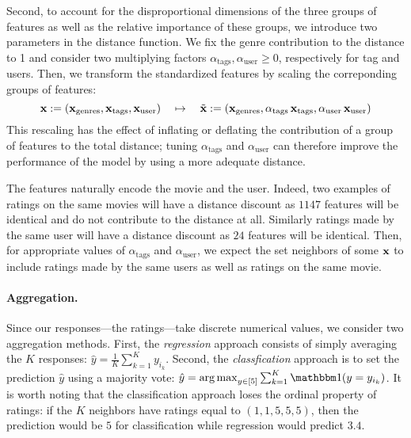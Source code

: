 \documentclass[bj, preprint]{imsart}
\begin{document}
Second, to account for the disproportional dimensions of the three groups of features as well as the relative importance of these groups, we introduce two parameters in the distance function. We fix the genre contribution to the distance to 1 and consider two multiplying factors $\alpha_\text{tags}, \alpha_\text{user}\geqslant 0$, respectively for tag and users. Then, we transform the standardized features by scaling the correponding groups of features:
\begin{equation*}
	\bx:=(\bx_\text{genres}, \bx_\text{tags}, \bx_\text{user})
	\quad\mapsto\quad
	\tilde{\bx}:=(\bx_\text{genres}, \alpha_\text{tags}\bx_\text{tags}, \alpha_\text{user}\bx_\text{user})
\end{equation*}
This rescaling has the effect of inflating or deflating the contribution of a group of features to the total distance; tuning $\alpha_\text{tags}$ and $\alpha_\text{user}$ can therefore improve the performance of the model by using a more adequate distance.

The features naturally encode the movie and the user. Indeed, two examples of ratings on the same movies will have a distance discount as $1147$ features will be identical and do not contribute to the distance at all. Similarly ratings made by the same user will have a distance discount as $24$ features will be identical. Then, for appropriate values of $\alpha_\text{tags}$ and $\alpha_\text{user}$, we expect the set neighbors of some $\operatorname{\mathbf x}$ to include ratings made by the same users as well as ratings on the same movie.

\paragraph{Aggregation.}\label{par:method.models.knn.agg}

Since our responses---the ratings---take discrete numerical values, we consider two aggregation methods. First, the \textit{regression} approach consists of simply averaging the $K$ responses: $\hat{y} = \frac 1K \sum_{k=1}^{K} y_{i_k}$. Second, the \textit{classfication} approach is to set the prediction $\hat{y}$ using a majority vote: $\hat{y} = \argmax_{y\in[5]}\sum_{k=1}^{K} \ind(y=y_{i_k})$. It is worth noting that the classification approach loses the ordinal property of ratings: if the $K$ neighbors have ratings equal to $(1,1,5,5,5)$, then the prediction would be $5$ for classification while regression would predict $3.4$.
\end{document}
